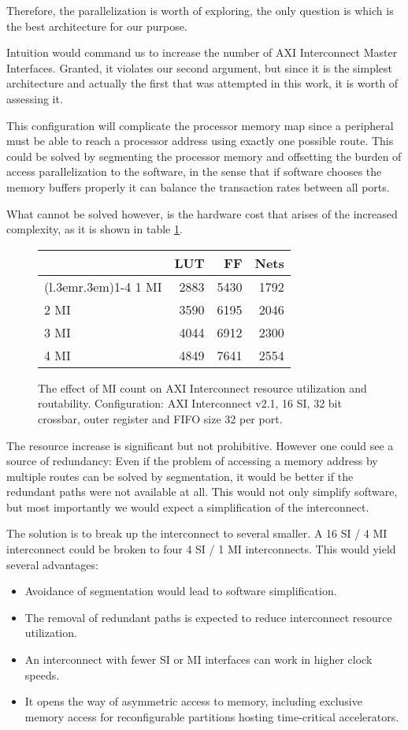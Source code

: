 Therefore, the parallelization is worth of exploring, the only question is
which is the best architecture for our purpose.

Intuition would command us to increase the number of AXI Interconnect
Master Interfaces. Granted, it violates our second argument, but since
it is the simplest architecture and actually the first that was attempted
in this work, it is worth of assessing it.

This configuration will complicate the processor memory map
since a peripheral must be able to reach a processor address using
exactly one possible route.
This could be solved by segmenting the processor memory
and offsetting the burden of access parallelization to the software,
in the sense that if software chooses the memory buffers properly
it can balance the \gls{transaction} rates between all ports.

What cannot be solved however, is the hardware cost that arises of the increased
complexity, as it is shown in table \ref{tab:int-mmi}.

\begin{figure}[ht!]
\centering
\begin{tabular}{lrrr}
\toprule
	& LUT	& FF	& Nets \\
\cmidrule(l{.3em}r{.3em}){1-4}
1 MI	& 2883	& 5430	& 1792	\\
2 MI	& 3590	& 6195	& 2046	\\
3 MI	& 4044	& 6912	& 2300	\\
4 MI	& 4849	& 7641	& 2554	\\
\bottomrule
\end{tabular}
\caption{The effect of MI count on AXI Interconnect resource utilization and routability.
	Configuration: AXI Interconnect v2.1, 16 SI, 32 bit crossbar,
	outer register and FIFO size 32 per port.}
\label{tab:int-mmi}
\end{figure}

The resource increase is significant but not prohibitive.
However one could see a source of redundancy: Even if the problem
of accessing a memory address by multiple routes can be solved by segmentation,
it would be better if the redundant paths were not available at all.
This would not only simplify software, but most importantly we would expect
a simplification of the interconnect.

The solution is to break up the interconnect to several smaller.
A 16 SI / 4 MI interconnect could be
broken to four 4 SI / 1 MI interconnects.
This would yield several advantages:
\begin{itemize}
\item	Avoidance of segmentation would lead to software simplification.
\item	The removal of redundant paths is expected to reduce interconnect resource utilization.
\item	An interconnect with fewer SI or MI interfaces can work in higher clock speeds.
\item	It opens the way of asymmetric access to memory, including exclusive memory access
	for reconfigurable partitions hosting time-critical accelerators.
\end{itemize}

